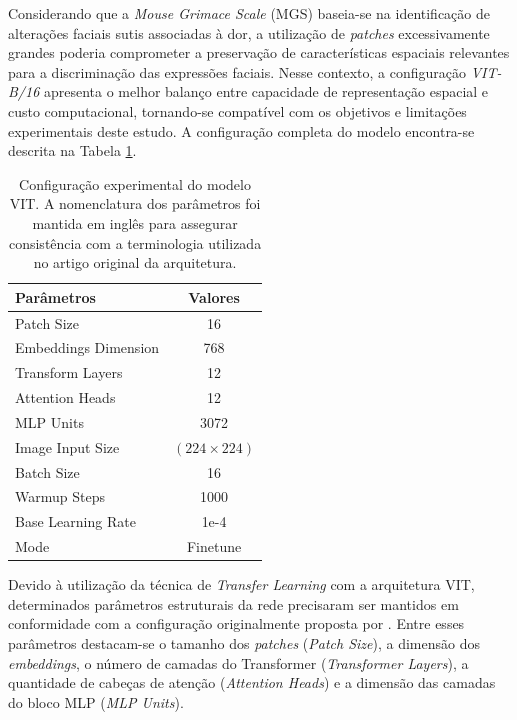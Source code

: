 Considerando que a \textit{Mouse Grimace Scale} (\acs{MGS}) baseia-se na identificação de alterações faciais sutis associadas à dor, a utilização de \textit{patches} excessivamente grandes poderia comprometer a preservação de características espaciais relevantes para a discriminação das expressões faciais. Nesse contexto, a configuração \textit{\acs{VIT}-B/16} apresenta o melhor balanço entre capacidade de representação espacial e custo computacional, tornando-se compatível com os objetivos e limitações experimentais deste estudo. A configuração completa do modelo encontra-se descrita na Tabela \ref{tab:vit_training_config}.

\begin{table}[h]
	\centering
	\caption{Configuração experimental do modelo \acs{VIT}. A nomenclatura dos parâmetros foi mantida em inglês para assegurar consistência com a terminologia utilizada no artigo original da arquitetura.}
	\label{tab:vit_training_config}
	
	\begin{tabular}{l | c}
		
		\toprule
		\textbf{Parâmetros} & \textbf{Valores}\\
		\midrule
		
		Patch Size
		& 16\\
		
		Embeddings Dimension
		& 768\\
		
		Transform Layers
		& 12\\
		
		Attention Heads 
		& 12\\
		
		\acs{MLP} Units
		& 3072\\
		
		Image Input Size 
		& $(224 \times 224)$\\
		
		Batch Size
		& 16\\
		
		Warmup Steps
		& 1000\\
		
		Base Learning Rate
		& 1e-4\\
		
		Mode
		& Finetune\\
		
		\bottomrule
	\end{tabular}
\end{table}


Devido à utilização da técnica de \textit{Transfer Learning} com a arquitetura \acs{VIT}, determinados parâmetros estruturais da rede precisaram ser mantidos em conformidade com a configuração originalmente proposta por \cite{dosovitskiy2020vit}. Entre esses parâmetros destacam-se o tamanho dos \textit{patches} (\textit{Patch Size}), a dimensão dos \textit{embeddings}, o número de camadas do Transformer (\textit{Transformer Layers}), a quantidade de cabeças de atenção (\textit{Attention Heads}) e a dimensão das camadas do bloco \acs{MLP} (\textit{\acs{MLP} Units}).

